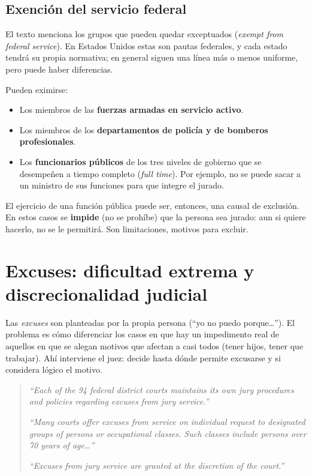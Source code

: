 \documentclass[12pt,oneside]{book}
\begin{document}
\subsection{Exención del servicio federal}

El texto menciona los grupos que pueden quedar exceptuados (\textit{exempt from federal service}). En Estados Unidos estas son pautas federales, y cada estado tendrá su propia normativa; en general siguen una línea más o menos uniforme, pero puede haber diferencias.

Pueden eximirse:
\begin{itemize}
\item Los miembros de las \textbf{fuerzas armadas en servicio activo}.
\item Los miembros de los \textbf{departamentos de policía y de bomberos profesionales}.
\item Los \textbf{funcionarios públicos} de los tres niveles de gobierno que se desempeñen a tiempo completo (\textit{full time}). Por ejemplo, no se puede sacar a un ministro de sus funciones para que integre el jurado.
\end{itemize}

El ejercicio de una función pública puede ser, entonces, una causal de exclusión. En estos casos se \textbf{impide} (no se prohíbe) que la persona sea jurado: aun si quiere hacerlo, no se le permitirá. Son limitaciones, motivos para excluir.

\section{Excuses: dificultad extrema y discrecionalidad judicial}

Las \textit{excuses} son planteadas por la propia persona (``yo no puedo porque\ldots''). El problema es cómo diferenciar los casos en que hay un impedimento real de aquellos en que se alegan motivos que afectan a casi todos (tener hijos, tener que trabajar). Ahí interviene el juez: decide hasta dónde permite excusarse y si considera lógico el motivo.

\begin{quote}
\textit{``Each of the 94 federal district courts maintains its own jury procedures and policies regarding excuses from jury service.''}

\textit{``Many courts offer excuses from service on individual request to designated groups of persons or occupational classes. Such classes include persons over 70 years of age\ldots''}

\textit{``Excuses from jury service are granted at the discretion of the court.''}
\end{quote}
\end{document}
